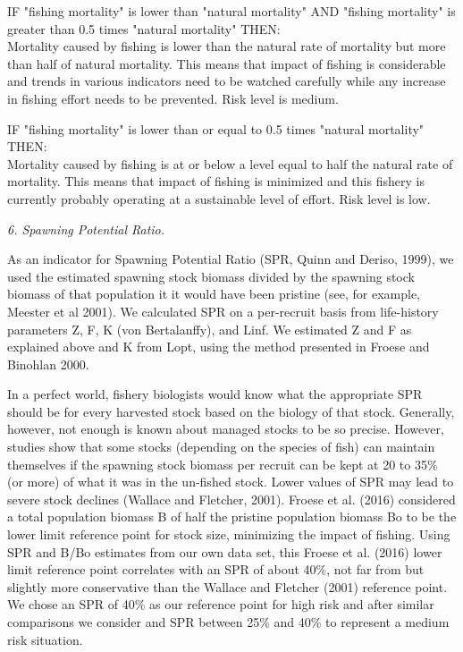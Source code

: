 IF "fishing mortality" is lower than "natural mortality" AND "fishing mortality" is greater than 0.5 times "natural mortality" THEN:\\[0cm]
Mortality caused by fishing is lower than the natural rate of mortality but more than half of natural mortality. This means that impact of fishing is considerable and trends in various indicators need to be watched carefully while any increase in fishing effort needs to be prevented. Risk level is medium.

IF "fishing mortality" is lower than or equal to 0.5 times "natural mortality" THEN:\\[0cm]
Mortality caused by fishing is at or below a level equal to half the natural rate of mortality. This means that impact of fishing is minimized and this fishery is currently probably operating at a sustainable level of effort. Risk level is low.

\clearpage
\newpage

\textit{6. Spawning Potential Ratio.}

As an indicator for Spawning Potential Ratio (SPR, Quinn and Deriso, 1999), we used the estimated spawning stock biomass divided by the spawning stock biomass of that population it it would have been pristine (see, for example, Meester et al 2001). We calculated SPR on a per-recruit basis from life-history parameters Z, F, K (von Bertalanffy), and Linf. We estimated Z and F as explained above and K from Lopt, using the method presented in Froese and Binohlan 2000.

In a perfect world, fishery biologists would know what the appropriate SPR should be for every harvested stock based on the biology of that stock. Generally, however, not enough is known about managed stocks to be so precise. However, studies show that some stocks (depending on the species of fish) can maintain themselves if the spawning stock biomass per recruit can be kept at 20 to 35\% (or more) of what it was in the un-fished stock. Lower values of SPR may lead to severe stock declines (Wallace and Fletcher, 2001). Froese et al. (2016) considered a total population biomass B of half the pristine population biomass Bo to be the lower limit reference point for stock size, minimizing the impact of fishing. Using SPR and B/Bo estimates from our own data set, this Froese et al. (2016) lower limit reference point correlates with an SPR of about 40\%, not far from but slightly more conservative than the Wallace and Fletcher (2001) reference point. We chose an SPR of 40\% as our reference point for high risk and after similar comparisons we consider and SPR between 25\% and 40\% to represent a medium risk situation.

